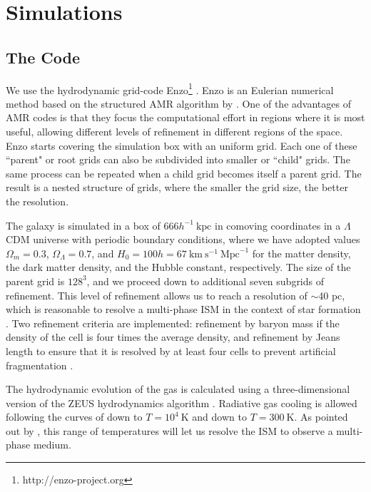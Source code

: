 \documentclass[twocolumn]{aastex}
\begin{document}
\section{Simulations}
\label{sec:simulations}

\subsection{The Code}
\label{subsec:code}

We use the hydrodynamic grid-code Enzo\footnote{http://enzo-project.org} \citep{Bryan_14}. Enzo is an Eulerian numerical method based on the structured AMR algorithm by \citet{Berger_Colella_89}. One of the advantages of AMR codes is that they focus the computational effort in regions where it is most useful, allowing different levels of refinement in different regions of the space. Enzo starts covering the simulation box with an uniform grid. Each one of these ``parent" or root grids can also be subdivided into smaller or ``child" grids. The same process can be repeated when a child grid becomes itself a parent grid. The result is a nested structure of grids, where the smaller the grid size, the better the resolution.

The galaxy is simulated in a box of $666 h^{-1}~\text{kpc}$ in comoving coordinates in a $\Lambda$CDM universe with periodic boundary conditions, where we have adopted values $\Omega_m=0.3$, $\Omega_\Lambda=0.7$, and $H_0 = 100h = 67~\text{km}~\text{s}^{-1}~\text{Mpc}^{-1}$ for the matter density, the dark matter density, and the Hubble constant, respectively. The size of the parent grid is $128^3$, and we proceed down to additional seven subgrids of refinement. This level of refinement allows us to reach a resolution of $\sim $40 pc, which is reasonable to resolve a multi-phase ISM in the context of star formation \citep{Ceverino_09}. Two refinement criteria are implemented: refinement by baryon mass if the density of the cell is four times the average density, and refinement by Jeans length to ensure that it is resolved by at least four cells to prevent artificial fragmentation \citep{Truelove_97}.

The hydrodynamic evolution of the gas is calculated using a three-dimensional version of the ZEUS hydrodynamics algorithm \citep{Stone_Norman_92}. Radiative gas cooling is allowed following the curves of \citet{Sarazin_White_87} down to $T=10^4~\text{K}$ and \citet{Rosen_Bregman_95} down to $T=300~\text{K}$. As pointed out by \citet{Ceverino_09}, this range of temperatures will let us resolve the ISM to observe a multi-phase medium.
\end{document}
